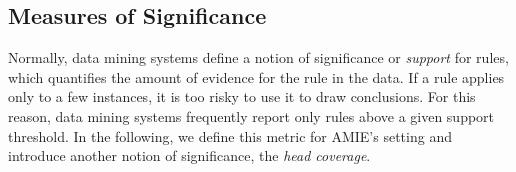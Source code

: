
\subsection{Measures of Significance} \label{subsec:statSignificance}


Normally, data mining systems define a notion of significance or \emph{support} for rules, which quantifies the amount of evidence for the rule in the data.
If a rule applies only to a few instances, it is too risky to use it to draw conclusions. For this reason,
data mining systems frequently report only rules above a given support threshold. 
In the following, we define this metric for AMIE's setting and introduce another notion of significance, the \emph{head coverage}.


